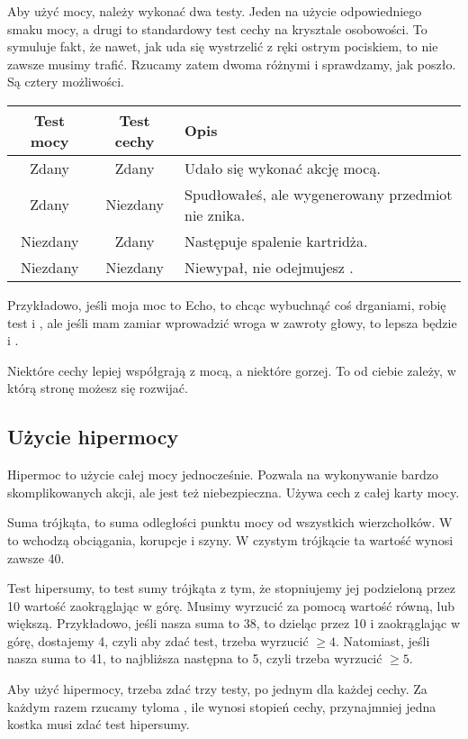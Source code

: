 Aby użyć mocy, należy wykonać dwa testy. Jeden na użycie odpowiedniego smaku mocy, a drugi to standardowy test cechy na krysztale osobowości.
To symuluje fakt, że nawet, jak uda się wystrzelić z ręki ostrym pociskiem, to nie zawsze musimy trafić.
Rzucamy zatem dwoma różnymi \dxx{} i sprawdzamy, jak poszło. Są cztery możliwości.

\begin{tabular}{c c l}
Test mocy	&	Test cechy	& Opis	\\
\hline
Zdany		&	Zdany		& Udało się wykonać akcję mocą. \\
Zdany 		&	Niezdany	& Spudłowałeś, ale wygenerowany przedmiot nie znika. \\
Niezdany	&	Zdany		& Następuje spalenie kartridża. \\
Niezdany	&	Niezdany	& Niewypał, nie odejmujesz \abkar{}. \\
\end{tabular}

Przykładowo, jeśli moja moc to Echo, to chcąc wybuchnąć coś drganiami, robię test \absm{} i \abs{}, ale jeśli mam zamiar wprowadzić wroga w zawroty głowy, to lepsza będzie \absm{} i \abp{}.

Niektóre cechy lepiej współgrają z mocą, a niektóre gorzej. To od ciebie zależy, w którą stronę możesz się rozwijać.

\subsection{Użycie hipermocy}
Hipermoc to użycie całej mocy jednocześnie.
Pozwala na wykonywanie bardzo skomplikowanych akcji, ale jest też niebezpieczna.
Używa cech z całej karty mocy.

Suma trójkąta, to suma odległości punktu mocy od wszystkich wierzchołków.
W to wchodzą obciągania, korupcje i szyny. W czystym trójkącie ta wartość wynosi zawsze 40.

Test hipersumy, to test sumy trójkąta z tym, że stopniujemy jej podzieloną przez 10 wartość zaokrąglając w górę.
Musimy wyrzucić za pomocą \dx{} wartość równą, lub większą.
Przykładowo, jeśli nasza suma to 38, to dzieląc przez 10 i zaokrąglając w górę, dostajemy 4, czyli aby zdać test, trzeba wyrzucić $\ge4$.
Natomiast, jeśli nasza suma to 41, to najbliższa następna to 5, czyli trzeba wyrzucić $\ge5$.

Aby użyć hipermocy, trzeba zdać trzy testy, po jednym dla każdej cechy.
Za każdym razem rzucamy tyloma \dx{}, ile wynosi stopień cechy, przynajmniej jedna kostka musi zdać test hipersumy.

